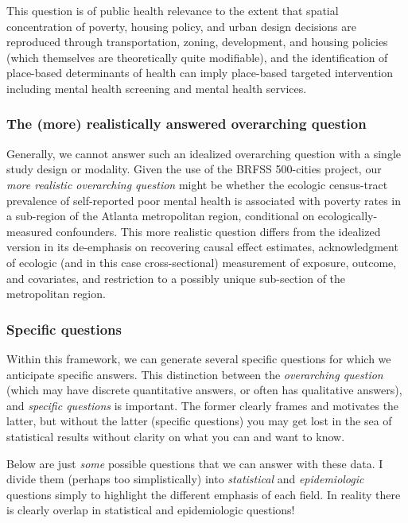 \documentclass[
]{book}
\begin{document}
This question is of public health relevance to the extent that spatial concentration of poverty, housing policy, and urban design decisions are reproduced through transportation, zoning, development, and housing policies (which themselves are theoretically quite modifiable), and the identification of place-based determinants of health can imply place-based targeted intervention including mental health screening and mental health services.

\hypertarget{the-more-realistically-answered-overarching-question}{%
\subsubsection{The (more) realistically answered overarching question}\label{the-more-realistically-answered-overarching-question}}

Generally, we cannot answer such an idealized overarching question with a single study design or modality. Given the use of the BRFSS 500-cities project, our \emph{more realistic overarching question} might be whether the ecologic census-tract prevalence of self-reported poor mental health is associated with poverty rates in a sub-region of the Atlanta metropolitan region, conditional on ecologically-measured confounders. This more realistic question differs from the idealized version in its de-emphasis on recovering causal effect estimates, acknowledgment of ecologic (and in this case cross-sectional) measurement of exposure, outcome, and covariates, and restriction to a possibly unique sub-section of the metropolitan region.

\hypertarget{specific-questions}{%
\subsubsection{Specific questions}\label{specific-questions}}

Within this framework, we can generate several specific questions for which we anticipate specific answers. This distinction between the \emph{overarching question} (which may have discrete quantitative answers, or often has qualitative answers), and \emph{specific questions} is important. The former clearly frames and motivates the latter, but without the latter (specific questions) you may get lost in the sea of statistical results without clarity on what you can and want to know.

Below are just \emph{some} possible questions that we can answer with these data. I divide them (perhaps too simplistically) into \emph{statistical} and \emph{epidemiologic} questions simply to highlight the different emphasis of each field. In reality there is clearly overlap in statistical and epidemiologic questions!
\end{document}
